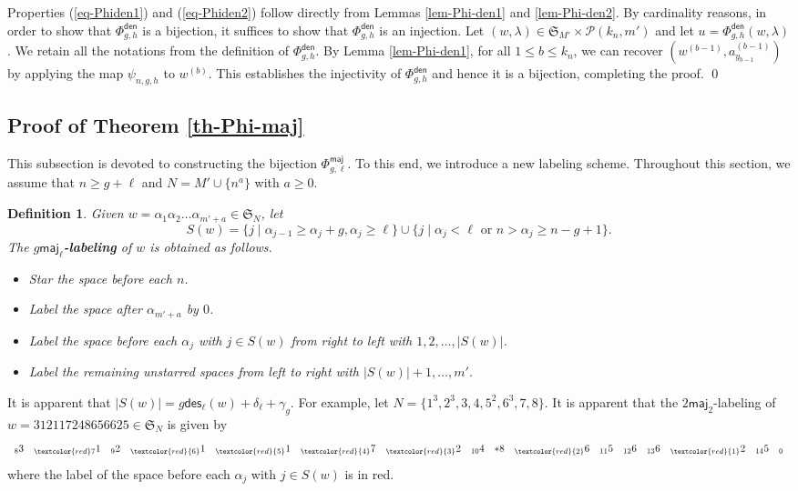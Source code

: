 \documentclass[12pt]{article}
\def\red{\textcolor{red}}
\numberwithin{equation}{section}
\def\red{\textcolor{red}}
\theoremstyle{plain}
\newtheorem{definition}[theorem]{Definition}
\def\des{\mathsf{des}}
\def\maj{\mathsf{maj}}
\def\den{\mathsf{den}}
\begin{document}
  
    Properties (\ref{eq-Phiden1}) and (\ref{eq-Phiden2}) follow  directly from  Lemmas \ref{lem-Phi-den1} and \ref{lem-Phi-den2}. By cardinality reasons, in order to show that $\Phi^{\den}_{g,h}$ is a bijection, it suffices to show that $\Phi^{\den}_{g,h}$ is an injection. 
  Let $(w, \lambda)\in \mathfrak{S}_{M'}\times \mathcal{P}(k_n, m')$ and let $u=\Phi^{\den}_{g,h}(w, \lambda)$. 
  We retain  all the notations  from  the definition of $\Phi^{\den}_{g,h}$.  By Lemma \ref{lem-Phi-den1}, for all $1\leq b\leq k_n$, we can recover 
  $(w^{(b-1)}, a^{(b-1)}_{y_{b-1}})$ by  applying the map $\psi_{n,g,h}$ to $w^{(b)}$. This establishes the injectivity of  $\Phi^{\den}_{g,h}$  and hence it  is a bijection, completing the proof. \qed 
  
   
   \subsection{Proof of Theorem \ref{th-Phi-maj}} This subsection is devoted to constructing the bijection $\Phi^{\maj}_{g,\ell}$.  To this end, we introduce a new labeling scheme.  
  Throughout this section, we   assume that  $n\geq g+\ell$ and   $N=M'\cup\{n^a\}$ with $a\geq 0$. 
   \begin{definition}
   	Given $w=\alpha_1\alpha_2\ldots \alpha_{m'+a}\in \mathfrak{S}_{N}$, 
   	let
   	$$
   	S(w)=\{j\mid \alpha_{j-1}\geq \alpha_j+g, \alpha_j\geq \ell\}\cup \{j\mid  \alpha_j<\ell\,\, \mbox{or}\,\, n>\alpha_j\geq n-g+1\}. 
   	$$
   	The {\bf  $g\maj_\ell$-labeling} of $w$  is obtained as follows.
   	\begin{itemize}
   		\item Star the space before each $n$.
   		\item Label the  space after $\alpha_{m'+a}$ by $0$.
   		\item Label the   space  before each  $\alpha_j$ with $j\in  S(w)$ from right to left with $1,2,\ldots, |S(w)|$. 
   		\item  Label the remaining unstarred   spaces   from left to right with $|S(w)|+1, \ldots, m' $.
   	\end{itemize}
   \end{definition}
   It is apparent that $|S(w)|=g\des_{\ell}(w)+\delta_\ell+\gamma_g$. 
   For example, let  $N=\{1^3, 2^3, 3, 4, 5^2, 6^3, 7, 8\}$.  It is apparent that the 
   $2\maj_2$-labeling of $w=312117248656625\in \mathfrak{S}_{N}$ is given by
   $$
   \begin{array}{llllllllllllllll} 
   _8 3&_{{\red 7}}1&_92&_{\red{6}}1&_{\red{5}}1&_{\red{4}}7&_{\red{3}}2&_{10}4&*8&_{\red{2}}6&_{11}5&_{12}6&_{13}6&_{\red{1}}2&_{14}5&_0\\
   \end{array}
   $$
    where the   label  of the space before each $\alpha_j$  with  $j\in S(w)$ is in red.
   
\end{document}
